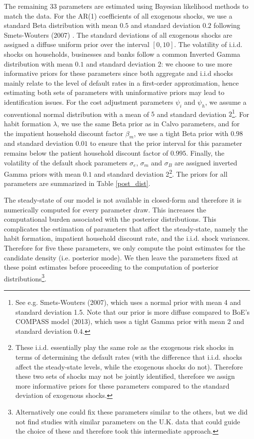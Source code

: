 \documentclass[12pt]{article}
\numberwithin{equation}{section}
\begin{document}
The remaining 33 parameters are estimated using Bayesian likelihood methods to match the data. For the AR(1) coefficients of all exogenous shocks, we use a standard Beta distribution with mean $0.5$ and standard deviation $0.2$ following Smets-Wouters (2007) . The standard deviations of all exogenous shocks are assigned a diffuse uniform prior over the interval $[0,10]$. The volatility of i.i.d. shocks on households, businesses and banks follow a common Inverted Gamma distribution with mean $0.1$ and standard deviation $2$: we choose to use more informative priors for these parameters since both aggregate and i.i.d shocks mainly relate to the level of default rates in a first-order approximation, hence estimating both sets of parameters with uninformative priors may lead to identification issues. For the cost adjustment parameters $\psi_i$ and $\psi_h$, we assume a conventional normal distribution with a mean of $5$ and standard deviation $2$\footnote{See e.g. Smets-Wouters (2007), which uses a normal prior with mean 4 and standard deviation 1.5. Note that our prior is more diffuse compared to BoE's COMPASS model (2013), which uses a tight Gamma prior with mean $2$ and standard deviation $0.4$.}. For habit formation $\lambda$, we use the same Beta prior as in Calvo parameters, and for the impatient household discount factor $\beta_m$, we use a tight Beta prior with $0.98$ and standard deviation $0.01$ to ensure that the prior interval for this parameter remains below the patient household discount factor of $0.995$. Finally, the volatility of the default shock parameters $\sigma_e$, $\sigma_m$ and $\sigma_B$ are assigned inverted Gamma priors with mean $0.1$ and standard deviation 2\footnote{These i.i.d. essentially play the same role as the exogenous risk shocks in terms of determining the default rates (with the difference that i.i.d. shocks affect the steady-state levels, while the exogenous shocks do not). Therefore these two sets of shocks may not be jointly identified, therefore we assign more informative priors for these parameters compared to the standard deviation of exogenous shocks.}. The priors for all parameters are summarized in Table \ref{post_dist}. 

The steady-state of our model is not available in closed-form and therefore it is numerically computed for every parameter draw. This increases the computational burden associated with the posterior distributions. This complicates the estimation of parameters that affect the steady-state, namely the habit formation, impatient household discount rate, and the i.i.d. shock variances. Therefore for five these parameters, we only compute the point estimates for the candidate density (i.e. posterior mode). We then leave the parameters fixed at these point estimates before proceeding to the computation of posterior distributions\footnote{Alternatively one could fix these parameters similar to the others, but we did not find studies with similar parameters on the U.K. data that could guide the choice of these and therefore took this intermediate approach.}.  
\end{document}
